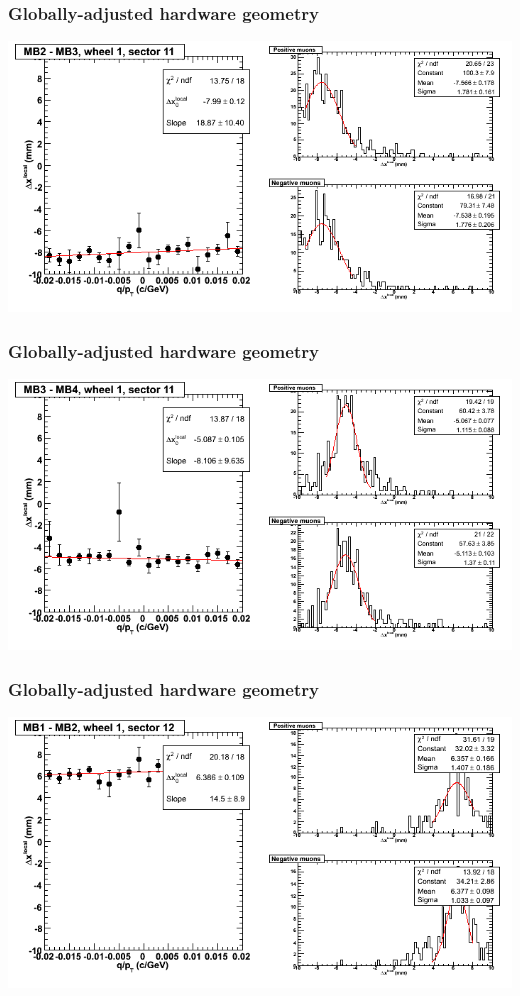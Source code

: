 \documentclass[compress]{beamer}
\begin{document}
\begin{frame}
\frametitle{Globally-adjusted hardware geometry}
\includegraphics[width=\linewidth]{NOV4_segdiffs_HW/dt13_resid_D_11_23.png}
\end{frame}

\begin{frame}
\frametitle{Globally-adjusted hardware geometry}
\includegraphics[width=\linewidth]{NOV4_segdiffs_HW/dt13_resid_D_11_34.png}
\end{frame}

\begin{frame}
\frametitle{Globally-adjusted hardware geometry}
\includegraphics[width=\linewidth]{NOV4_segdiffs_HW/dt13_resid_D_12_12.png}
\end{frame}
\end{document}
